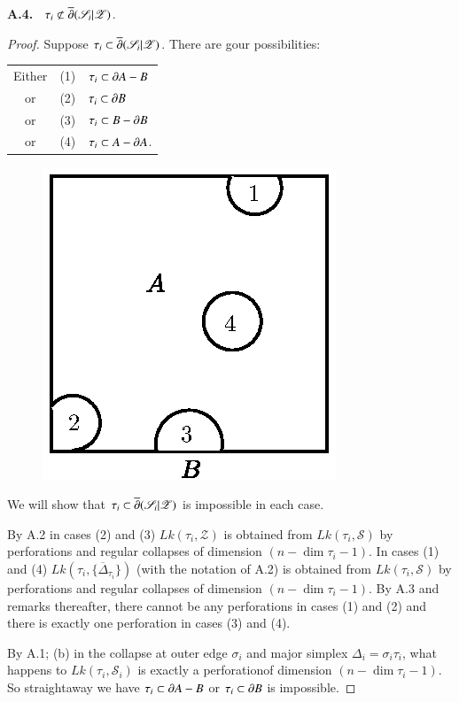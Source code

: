 \medskip
\noindent
{\bf A.4.}~ $\tau_{i}\not\subset \overline{\partial}(\mathscr{S}_{i}|\mathscr{Z})$.

\begin{proof}
Suppose $\tau_{i}\subset \overline{\partial}(\mathscr{S}_{i}|\mathscr{Z})$. There are gour possibilities:
\begin{center}
\begin{tabular}{ccl}
Either & (1) & $\tau_{i}\subset \partial A-B$\\
or & (2) & $\tau_{i}\subset \partial B$\\
or & (3) & $\tau_{i}\subset B-\partial B$\\
or & (4) & $\tau_{i}\subset A-\partial A$.
\end{tabular}
\end{center}
\begin{figure}[H]
\centering
\includegraphics{figure/fig23.eps}
\end{figure}

We will show that $\tau_{i}\subset \overline{\partial}(\mathscr{S}_{i}|\mathscr{Z})$ is impossible in each case.

By A.2 in cases (2) and (3) $Lk(\tau_{i},\mathscr{Z})$ is obtained from $Lk(\tau_{i},\mathscr{S})$ by perforations and regular collapses of dimension $(n-\dim\tau_{i}-1)$. In cases (1) and (4) $Lk(\tau_{i},\{\overline{\Delta}_{\tau_{i}}\})$ (with the notation of A.2) is obtained from $Lk(\tau_{i},\mathscr{S})$ by perforations and regular collapses of dimension $(n-\dim\tau_{i}-1)$. By A.3 and remarks thereafter, there cannot be any perforations in cases (1) and (2) and there is exactly one perforation in cases (3) and (4).

By A.1; (b) in the collapse at outer edge $\sigma_{i}$ and major simplex $\Delta_{i}=\sigma_{i}\tau_{i}$, what happens to $Lk(\tau_{i},\mathscr{S}_{i})$ is exactly a perforation\pageoriginale of dimension $(n-\dim \tau_{i}-1)$. So straightaway we have $\tau_{i}\subset \partial A-B$ or $\tau_{i}\subset \partial B$ is impossible.


\end{proof}
